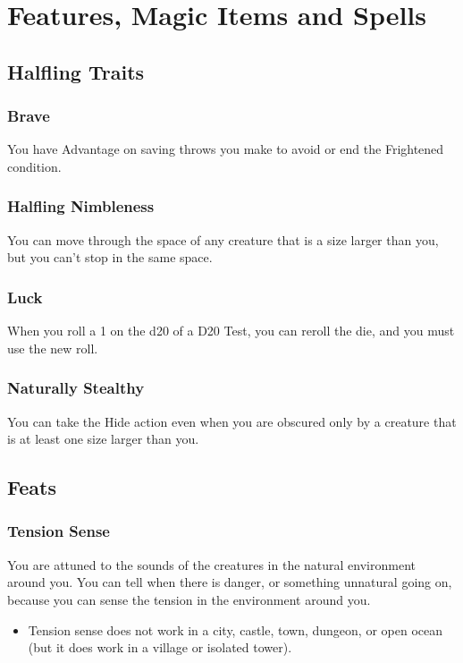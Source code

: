 \documentclass[letterpaper,openany,oneside,twocolumn]{book}
\begin{document}
\onecolumn


\rendercharactersheet

\renderbackgroundsheet

\renderspellsheet


\restoregeometry
\twocolumn

\chapter*{Features, Magic Items and Spells}

\section*{Halfling Traits}
\subsection*{Brave}
You have Advantage on saving throws you make to avoid or end the Frightened condition.
\subsection*{Halfling Nimbleness}
You can move through the space of any creature that is a size larger than you, but you can't stop in the same space.
\subsection*{Luck}
When you roll a 1 on the d20 of a D20 Test, you can reroll the die, and you must use the new roll.
\subsection*{Naturally Stealthy}
You can take the Hide action even when you are obscured only by a creature that is at least one size larger than you.

\section*{Feats}
\subsection*{Tension Sense}
You are attuned to the sounds of the creatures in the natural environment around you. You can tell when there is danger, or something unnatural going on, because you can sense the tension in the environment around you.
\begin{itemize}
	\item Tension sense does not work in a city, castle, town, dungeon, or open ocean (but it does work in a village or isolated tower).
\end{itemize}
\end{document}
